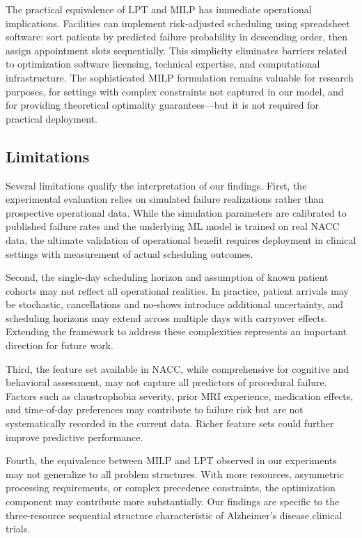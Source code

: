 The practical equivalence of LPT and MILP has immediate operational implications. Facilities can implement risk-adjusted scheduling using spreadsheet software: sort patients by predicted failure probability in descending order, then assign appointment slots sequentially. This simplicity eliminates barriers related to optimization software licensing, technical expertise, and computational infrastructure. The sophisticated MILP formulation remains valuable for research purposes, for settings with complex constraints not captured in our model, and for providing theoretical optimality guarantees---but it is not required for practical deployment.

\subsection{Limitations}

Several limitations qualify the interpretation of our findings. First, the experimental evaluation relies on simulated failure realizations rather than prospective operational data. While the simulation parameters are calibrated to published failure rates and the underlying ML model is trained on real NACC data, the ultimate validation of operational benefit requires deployment in clinical settings with measurement of actual scheduling outcomes.

Second, the single-day scheduling horizon and assumption of known patient cohorts may not reflect all operational realities. In practice, patient arrivals may be stochastic, cancellations and no-shows introduce additional uncertainty, and scheduling horizons may extend across multiple days with carryover effects. Extending the framework to address these complexities represents an important direction for future work.

Third, the feature set available in NACC, while comprehensive for cognitive and behavioral assessment, may not capture all predictors of procedural failure. Factors such as claustrophobia severity, prior MRI experience, medication effects, and time-of-day preferences may contribute to failure risk but are not systematically recorded in the current data. Richer feature sets could further improve predictive performance.

Fourth, the equivalence between MILP and LPT observed in our experiments may not generalize to all problem structures. With more resources, asymmetric processing requirements, or complex precedence constraints, the optimization component may contribute more substantially. Our findings are specific to the three-resource sequential structure characteristic of Alzheimer's disease clinical trials.

